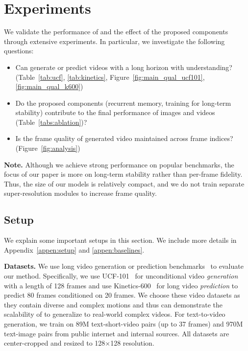 

\section{Experiments}
We validate the performance of \sname and the effect of the proposed components through extensive experiments. In particular, we investigate the following questions:
\begin{itemize}[leftmargin=*,itemsep=0mm]
\item Can \sname generate or predict videos with a long horizon with understanding? (Table~\ref{tab:ucf}, \ref{tab:kinetics}, Figure~\ref{fig:main_qual_ucf101}, \ref{fig:main_qual_k600})
\item Do the proposed components (recurrent memory, training for long-term stability) contribute to the final performance of images and videos (Table~\ref{tabs:ablation})?
\item Is the frame quality of generated video maintained across frame indices? (Figure~\ref{fig:analysis}) 
\end{itemize}

\vspace{0.02in}
\noindent\textbf{Note.} Although we achieve strong performance on popular benchmarks, the focus of our paper is more on long-term stability rather than per-frame fidelity. Thus, the size of our models is relatively compact, and we do not train separate super-resolution modules to increase frame quality.



\subsection{Setup}
\label{subsec:setup}

We explain some important setups in this section. We include more details in Appendix~\ref{appen:setup} and \ref{appen:baselines}.

\vspace{0.02in}
\noindent\textbf{Datasets.}
We use long video generation or prediction benchmarks~\citep{skorokhodov2021stylegan, yan2023temporally} to evaluate our method. Specifically, we use UCF-101~\citep{soomro2012ucf101} for unconditional video \emph{generation} with a length of 128 frames and use Kinetics-600~\citep{kay2017kinetics} for long video \emph{prediction} to predict 80 frames conditioned on 20 frames. We choose these video datasets as they contain diverse and complex motions and thus can demonstrate the scalability of \sname to generalize to real-world complex videos. For text-to-video generation, we train on 89M text-short-video
pairs (up to 37 frames) and
970M text-image pairs from public internet and internal
sources. All datasets are center-cropped and resized to 128$\times$128 resolution.

